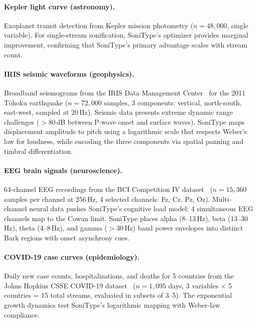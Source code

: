 \documentclass[sigchi, nonacm]{acmart}
\begin{document}
\paragraph{Kepler light curve (astronomy).} Exoplanet transit detection from Kepler mission photometry ($n = 48{,}000$, single variable). For single-stream sonification, SoniType's optimizer provides marginal improvement, confirming that SoniType's primary advantage scales with stream count.

\paragraph{IRIS seismic waveforms (geophysics).} Broadband seismograms from the IRIS Data Management Center~\cite{iris2012data} for the 2011 T\={o}hoku earthquake ($n = 72{,}000$ samples, 3 components: vertical, north-south, east-west, sampled at 20\,Hz). Seismic data presents extreme dynamic range challenges ($>$80\,dB between P-wave onset and surface waves). SoniType maps displacement amplitude to pitch using a logarithmic scale that respects Weber's law for loudness, while encoding the three components via spatial panning and timbral differentiation.

\paragraph{EEG brain signals (neuroscience).} 64-channel EEG recordings from the BCI Competition IV dataset~\cite{tangermann2012bci} ($n = 15{,}360$ samples per channel at 256\,Hz, 4 selected channels: Fz, Cz, Pz, Oz). Multi-channel neural data pushes SoniType's cognitive load model: 4 simultaneous EEG channels map to the Cowan limit. SoniType places alpha (8--13\,Hz), beta (13--30\,Hz), theta (4--8\,Hz), and gamma ($>$30\,Hz) band power envelopes into distinct Bark regions with onset asynchrony cues.

\paragraph{COVID-19 case curves (epidemiology).} Daily new case counts, hospitalizations, and deaths for 5 countries from the Johns Hopkins CSSE COVID-19 dataset~\cite{dong2020interactive} ($n = 1{,}095$ days, 3 variables $\times$ 5 countries = 15 total streams, evaluated in subsets of 3--5). The exponential growth dynamics test SoniType's logarithmic mapping with Weber-law compliance.
\end{document}
